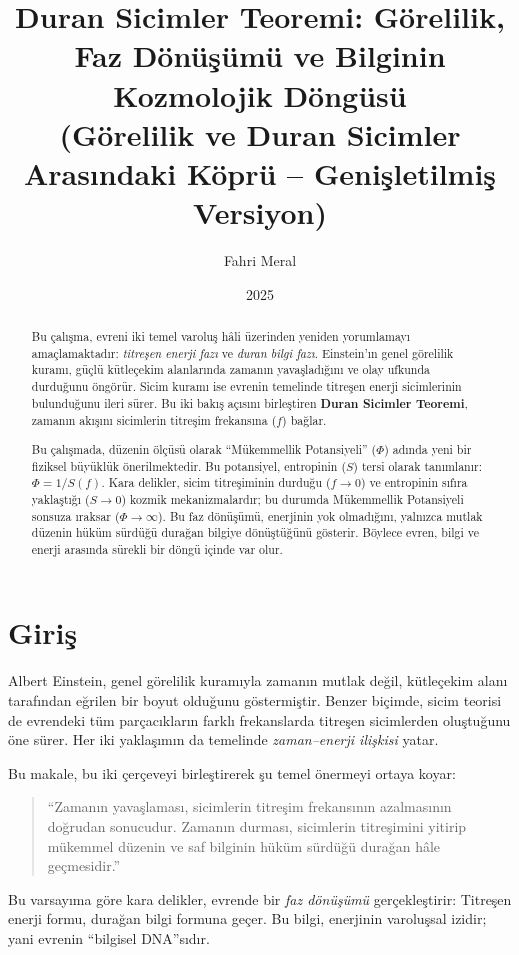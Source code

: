 \documentclass[12pt,a4paper]{article}
\title{\textbf{Duran Sicimler Teoremi: Görelilik, Faz Dönüşümü ve Bilginin Kozmolojik Döngüsü}\\
\large (Görelilik ve Duran Sicimler Arasındaki Köprü – Genişletilmiş Versiyon)}
\author{Fahri Meral}
\date{2025}
\begin{document}
\maketitle

\begin{abstract}
Bu çalışma, evreni iki temel varoluş hâli üzerinden yeniden yorumlamayı amaçlamaktadır: \textit{titreşen enerji fazı} ve \textit{duran bilgi fazı}. 
Einstein’ın genel görelilik kuramı, güçlü kütleçekim alanlarında zamanın yavaşladığını ve olay ufkunda durduğunu öngörür. 
Sicim kuramı ise evrenin temelinde titreşen enerji sicimlerinin bulunduğunu ileri sürer. 
Bu iki bakış açısını birleştiren \textbf{Duran Sicimler Teoremi}, zamanın akışını sicimlerin titreşim frekansına ($f$) bağlar. 

Bu çalışmada, düzenin ölçüsü olarak ``Mükemmellik Potansiyeli'' ($\Phi$) adında yeni bir fiziksel büyüklük önerilmektedir. Bu potansiyel, entropinin ($S$) tersi olarak tanımlanır: $\Phi = 1/S(f)$. Kara delikler, sicim titreşiminin durduğu ($f \to 0$) ve entropinin sıfıra yaklaştığı ($S \to 0$) kozmik mekanizmalardır; bu durumda Mükemmellik Potansiyeli sonsuza ıraksar ($\Phi \to \infty$). Bu faz dönüşümü, enerjinin yok olmadığını, yalnızca mutlak düzenin hüküm sürdüğü durağan bilgiye dönüştüğünü gösterir. Böylece evren, bilgi ve enerji arasında sürekli bir döngü içinde var olur.
\end{abstract}

\section{Giriş}
Albert Einstein, genel görelilik kuramıyla zamanın mutlak değil, kütleçekim alanı tarafından eğrilen bir boyut olduğunu göstermiştir. 
Benzer biçimde, sicim teorisi de evrendeki tüm parçacıkların farklı frekanslarda titreşen sicimlerden oluştuğunu öne sürer. 
Her iki yaklaşımın da temelinde \textit{zaman–enerji ilişkisi} yatar.

Bu makale, bu iki çerçeveyi birleştirerek şu temel önermeyi ortaya koyar:
\begin{quote}
``Zamanın yavaşlaması, sicimlerin titreşim frekansının azalmasının doğrudan sonucudur. 
Zamanın durması, sicimlerin titreşimini yitirip mükemmel düzenin ve saf bilginin hüküm sürdüğü durağan hâle geçmesidir.''
\end{quote}

Bu varsayıma göre kara delikler, evrende bir \textit{faz dönüşümü} gerçekleştirir: 
Titreşen enerji formu, durağan bilgi formuna geçer. 
Bu bilgi, enerjinin varoluşsal izidir; yani evrenin ``bilgisel DNA''sıdır.
\end{document}
